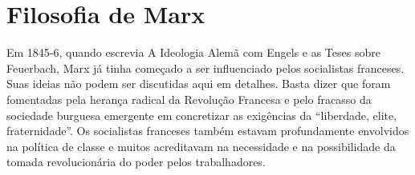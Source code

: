 \section{Filosofia de Marx}
 \par 
Em 1845-6, quando escrevia A Ideologia Alemã com Engels e as Teses sobre Feuerbach, Marx já tinha começado a ser influenciado pelos socialistas franceses. Suas ideias não podem ser discutidas aqui em detalhes. Basta dizer que foram fomentadas pela herança radical da Revolução Francesa e pelo fracasso da sociedade burguesa emergente em concretizar as exigências da “liberdade, elite, fraternidade”. Os socialistas franceses também estavam profundamente envolvidos na política de classe e muitos acreditavam na necessidade e na possibilidade da tomada revolucionária do poder pelos trabalhadores.
 \par 
